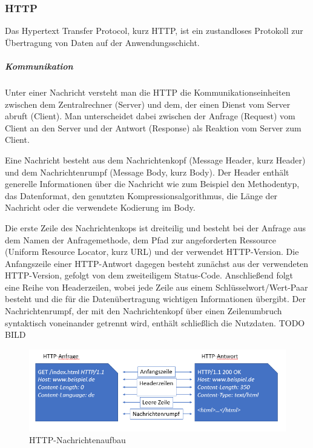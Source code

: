 \subsubsection{HTTP}
Das Hypertext Transfer Protocol, kurz HTTP, ist ein zustandloses Protokoll zur Übertragung von Daten auf der Anwendungsschicht.

\subparagraph{Kommunikation}
Unter einer Nachricht versteht man die HTTP die Kommunikationseinheiten zwischen dem Zentralrechner (Server) und dem, der einen Dienst vom Server abruft (Client). Man unterscheidet dabei zwischen der Anfrage (Request) vom Client an den Server und der Antwort (Response) als Reaktion vom Server zum Client. 
\newline

Eine Nachricht besteht aus dem Nachrichtenkopf (Message Header, kurz Header) und dem Nachrichtenrumpf (Message Body, kurz Body). Der Header enthält generelle Informationen über die Nachricht wie zum Beispiel den Methodentyp, das Datenformat, den genutzten Kompressionsalgorithmus, die Länge der Nachricht oder die verwendete Kodierung im Body. 
\newline

Die erste Zeile des Nachrichtenkops ist dreiteilig und besteht bei der Anfrage aus dem Namen der Anfragemethode, dem Pfad zur angeforderten Ressource (Uniform Resource Locator, kurz URL) und der verwendet HTTP-Version. Die Anfangszeile einer HTTP-Antwort dagegen besteht zunächst aus der verwendeten HTTP-Version, gefolgt von dem zweiteiligem Status-Code. Anschließend folgt eine Reihe von Headerzeilen, wobei jede Zeile aus einem Schlüsselwort/Wert-Paar besteht und die für die Datenübertragung wichtigen Informationen übergibt. Der Nachrichtenrumpf, der mit den Nachrichtenkopf über einen Zeilenumbruch syntaktisch voneinander getrennt wird, enthält schließlich die Nutzdaten. TODO BILD
\newline

\begin{figure}[h]
\centering
\includegraphics[width=\textwidth]{images/netzwerkprotokolle_http.PNG}
\caption{HTTP-Nachrichtenaufbau}
\end{figure}

